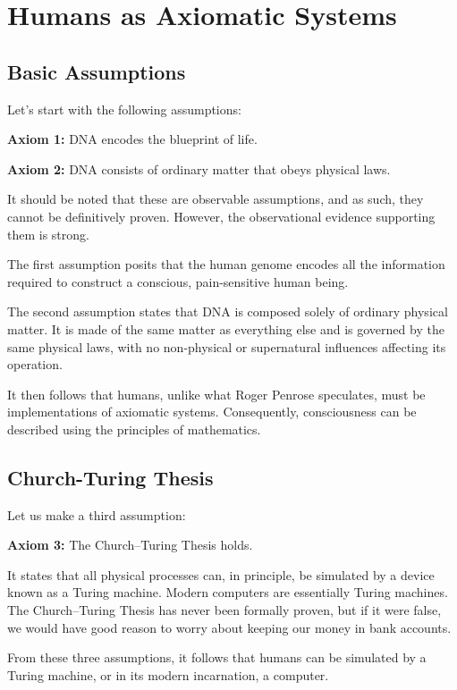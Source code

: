 \chapter{Humans as Axiomatic Systems}
\label{chap:humans-as-axiomatic-systems}

\section{Basic Assumptions}

Let's start with the following assumptions:

\textbf{Axiom 1:} DNA encodes the blueprint of life.

\textbf{Axiom 2:} DNA consists of ordinary matter that obeys physical laws.

It should be noted that these are observable assumptions, and as such, they cannot be definitively proven. However, the observational evidence supporting them is strong.

The first assumption posits that the human genome encodes all the information required to construct a conscious, pain-sensitive human being.

The second assumption states that DNA is composed solely of ordinary physical matter. It is made of the same matter as everything else and is governed by the same physical laws, 
with no non-physical or supernatural influences affecting its operation.

It then follows that humans, unlike what Roger Penrose speculates, must be implementations of axiomatic systems. 
Consequently, consciousness can be described using the principles of mathematics.


\section{Church-Turing Thesis}

Let us make a third assumption:

\textbf{Axiom 3:} The Church--Turing Thesis holds.

It states that all physical processes can, in principle, be simulated by a device known as a Turing machine. Modern computers are essentially Turing machines.
The Church--Turing Thesis has never been formally proven, but if it were false, we would have good reason to worry about keeping our money in bank accounts.

From these three assumptions, it follows that humans can be simulated by a Turing machine, or in its modern incarnation, a computer. 


